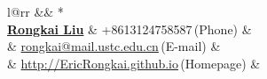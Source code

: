 \newcommand{\paintInVisa}[3]{
    \begin{minipage}{#1}
        \texttt{[image: \#3]}
    \end{minipage} 
}

\newcommand{\myheaderInVisa}{
\begin{tabular*}{\textwidth}{l@{\extracolsep{\fill}}rr}
  && \multirow{4}*{}\\
  \specialrule{0em}{0pt}{0pt}
  \textbf{\href{http://EricRongkai.github.io}{\LARGE Rongkai Liu}} & +8613124758587$\,${\color{labelgrey}(Phone)} &\\
   & \href{mailto:zhangzc@pku.edu.cn}{rongkai@mail.ustc.edu.cn}$\,${\color{labelgrey}(E-mail)} & \\
   \textbf{} \quad& \href{mailto:zhangzc@pku.edu.cn}{http://EricRongkai.github.io}$\, ${\color{labelgrey}(Homepage)} & \\
  \end{tabular*}\\\vspace{0.1in}
}

\myheaderInVisa

